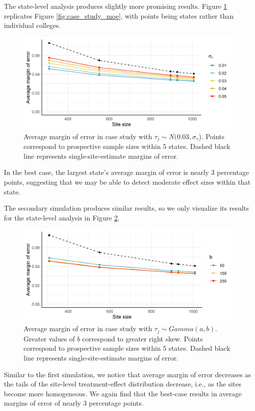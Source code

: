 \documentclass[]{article}
\begin{document}
The state-level analysis produces slightly more promising results.
Figure \ref{fig:case_study_states_moe} replicates Figure \ref{fig:case_study_moe}, with points being states rather than individual colleges.
\begin{figure}[t]
    \centering
    \includegraphics[width=\textwidth]{case_study_states_moe.png}
    \caption{Average margin of error in case study with $\tau_j \sim N(0.03, \sigma_\tau$). Points correspond to prospective sample sizes within 5 states. Dashed black line represents single-site-estimate margins of error.}
    \label{fig:case_study_states_moe}
\end{figure}
In the best case, the largest state's average margin of error is nearly 3 percentage points, suggesting that we may be able to detect moderate effect sizes within that state.

The secondary simulation produces similar results, so we only visualize its results for the state-level analysis in Figure \ref{fig:case_study_2_states_moe}.
\begin{figure}[t]
    \centering
    \includegraphics[width=\textwidth]{case_study2_states_moe.png}
    \caption{Average margin of error in case study with $\tau_j \sim Gamma(a,b)$. Greater values of $b$ correspond to greater right skew. Points correspond to prospective sample sizes within 5 states. Dashed black line represents single-site-estimate margins of error.}
    \label{fig:case_study_2_states_moe}
\end{figure}
Similar to the first simulation, we notice that average margin of error decreases as the tails of the site-level treatment-effect distribution decrease, i.e., as the sites become more homogeneous.
We again find that the best-case results in average margins of error of nearly 3 percentage points.
\end{document}
